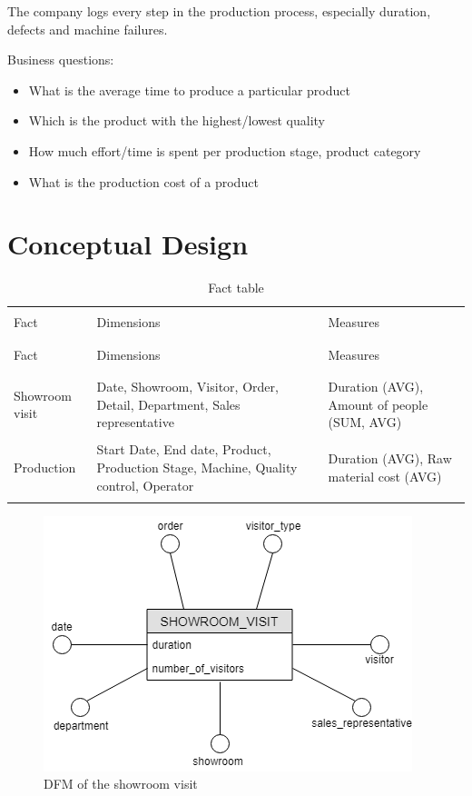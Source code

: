 \documentclass[letterpaper,12pt]{article}
\begin{document}
The company logs every step in the production process, especially duration, defects and machine failures.

Business questions:
\begin{itemize}
        \item What is the average time to produce a particular product
        \item Which is the product with the highest/lowest quality
        \item How much effort/time is spent per production stage, product category
				\item What is the production cost of a product
\end{itemize}

\section{Conceptual Design}

\begin{longtable}{p{3cm}p{6cm}p{4cm}}
        \caption{Fact table} \\
        \hline \\
        Fact & Dimensions & Measures \\
        \hline \\
        \endfirsthead \\
        Fact & Dimensions & Measures \\
        \endhead \\
        \hline \\
        Showroom visit & Date, Showroom, Visitor, Order, Detail, Department, Sales representative & Duration (AVG), Amount of people (SUM, AVG) \\
        \hline \\
        Production & Start Date, End date, Product, Production Stage, Machine, Quality control, Operator & Duration (AVG), Raw material cost (AVG) \\
        \hline \\
\end{longtable}

\begin{figure}[H] 
        \centering
        \includegraphics[scale=0.65]{../images/DFM_Showroom_Simple.png}
        \caption{
                \label{fig:showroom}  
                DFM of the showroom visit
        }
\end{figure}
\end{document}
